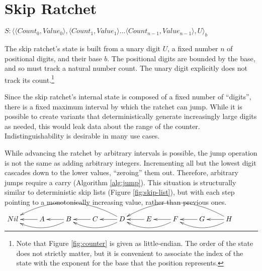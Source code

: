 \documentclass[twocolumn]{article}
\begin{document}
	\section{Skip Ratchet}
	
	\begin{figure*}[h]
		\centering
		
		$S : \langle \langle Count_{0}, Value_{0} \rangle, \langle Count_{1}, Value_{1} \rangle \ldots \langle Count_{n-1}, Value_{n-1} \rangle, U\rangle_{b}$
		
		\caption{Skip Ratchet Counter State}
		\label{fig:counter}
	\end{figure*}

	The skip ratchet's state is built from a unary digit $U$, a fixed number $n$ of positional digits, and their base $b$. The positional digits are bounded by the base, and so must track a natural number count. The unary digit explicitly does not track its count.\footnote{Note that Figure \ref{fig:counter} is given as little-endian. The order of the state does not strictly matter, but it is convenient to associate the index of the state with the exponent for the base that the position represents.}
    
    Since the skip ratchet's internal state is composed of a fixed number of ``digits'', there is a fixed maximum interval by which the ratchet can jump. While it is possible to create variants that deterministically generate increasingly large digits as needed, this would leak data about the range of the counter. Indistinguishability is desirable in many use cases.
    
    While advancing the ratchet by arbitrary intervals is possible, the jump operation is not the same as adding arbitrary integers. Incrementing all but the lowest digit cascades down to the lower values, ``zeroing'' them out. Therefore, arbitrary jumps require a carry (Algorithm \ref{alg:jump}). This situation is structurally similar to deterministic skip lists \cite{deterministic-skip-lists} (Figure \ref{fig:skip-list}), but with each step pointing to a monotonically increasing value, rather than previous ones.
 
	\begin{figure*}[h]
		\centering
		
		$\xymatrix{
			  Nil
			& A \ar[l]
			& B \ar[l] , \ar@/^1pc/[ll]
			& C \ar[l]
			& D \ar[l] , \ar@/^1pc/[ll] , \ar@/_2pc/[llll]
			& E \ar[l]
			& F \ar[l] , \ar@/^1pc/[ll]
			& G \ar[l]
			& H \ar[l] , \ar@/^1pc/[ll] , \ar@/_2pc/[llll]
		}$
	
		\caption{Deterministic Skip List}
		\label{fig:skip-list}
	\end{figure*}
\end{document}
